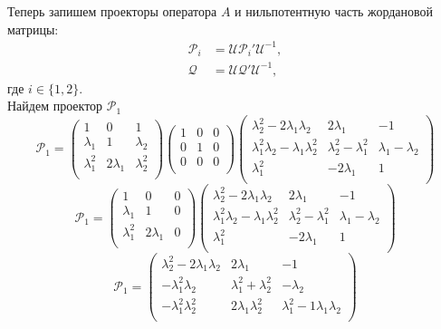 Теперь запишем проекторы оператора $A$ и нильпотентную часть жордановой матрицы:
$$
	\begin{aligned}
		\mathcal{P}_i &= \mathcal{U}\mathcal{P}_i'\mathcal{U}^{-1}, \\ 
 		\mathcal{Q} &= \mathcal{U}\mathcal{Q}'\mathcal{U}^{-1}, 
	\end{aligned}
$$
где $i \in \{1,2\}$. \\
Найдем проектор $\mathcal{P}_1$
$$
\mathcal{P}_1 = 
\begin{pmatrix}
  	1 & 0 & 1\\
  	\lambda_1 & 1 & \lambda_2 \\
  	\lambda_1^2 & 2\lambda_1 & \lambda_2^2 \\
\end{pmatrix}
 \begin{pmatrix}
  	1 & 0 & 0\\
  	0 & 1 & 0 \\
  	0 & 0 & 0 \\
\end{pmatrix}
\begin{pmatrix}
  	\lambda_2^2-2\lambda_1\lambda_2 & 2\lambda_1 & -1  \\
  	\lambda_1^2\lambda_2 - \lambda_1\lambda_2^2 & \lambda_2^2 - \lambda_1^2 & \lambda_1 - \lambda_2  \\
  	\lambda_1^2 & -2\lambda_1 & 1  \\
 \end{pmatrix} 		
$$
$$
\mathcal{P}_1 = 
\begin{pmatrix}
  	1 & 0 & 0\\
  	\lambda_1 & 1 & 0 \\
  	\lambda_1^2 & 2\lambda_1 & 0 \\
\end{pmatrix}
\begin{pmatrix}
  	\lambda_2^2-2\lambda_1\lambda_2 & 2\lambda_1 & -1  \\
  	\lambda_1^2\lambda_2 - \lambda_1\lambda_2^2 & \lambda_2^2 - \lambda_1^2 & \lambda_1 - \lambda_2  \\
  	\lambda_1^2 & -2\lambda_1 & 1  \\
 \end{pmatrix} 		
$$
$$
\mathcal{P}_1 = 
\begin{pmatrix}
  	\lambda_2^2-2\lambda_1\lambda_2 & 2\lambda_1 & -1  \\
  	-\lambda_1^2\lambda_2 & \lambda_1^2+\lambda_2^2  & - \lambda_2  \\
  	-\lambda_1^2\lambda_2^2 & 2\lambda_1\lambda_2^2 & \lambda_1^2-1\lambda_1\lambda_2  \\
 \end{pmatrix} 	
$$
